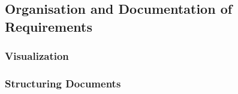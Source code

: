 \subsection{Organisation and Documentation of Requirements}

\subsubsection{Visualization}

\subsubsection{Structuring Documents}